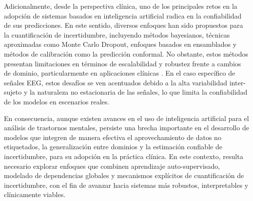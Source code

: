 Adicionalmente, desde la perspectiva clínica, uno de los principales retos en la adopción de sistemas basados en inteligencia artificial radica en la confiabilidad de sus predicciones. En este sentido, diversos enfoques han sido propuestos para la cuantificación de incertidumbre, incluyendo métodos bayesianos, técnicas aproximadas como Monte Carlo Dropout, enfoques basados en ensamblados y métodos de calibración como la predicción conformal. No obstante, estos métodos presentan limitaciones en términos de escalabilidad y robustez frente a cambios de dominio, particularmente en aplicaciones clínicas \cite{Loftus2022,ovadia2019trustmodelsuncertaintyevaluating}. En el caso específico de señales EEG, estos desafíos se ven acentuados debido a la alta variabilidad inter-sujeto y la naturaleza no estacionaria de las señales, lo que limita la confiabilidad de los modelos en escenarios reales.

En consecuencia, aunque existen avances en el uso de inteligencia artificial para el análisis de trastornos mentales, persiste una brecha importante en el desarrollo de modelos que integren de manera efectiva el aprovechamiento de datos no etiquetados, la generalización entre dominios y la estimación confiable de incertidumbre, para su adopción en la práctica clínica. En este contexto, resulta necesario explorar enfoques que combinen aprendizaje auto-supervisado, modelado de dependencias globales y mecanismos explícitos de cuantificación de incertidumbre, con el fin de avanzar hacia sistemas más robustos, interpretables y clínicamente viables.